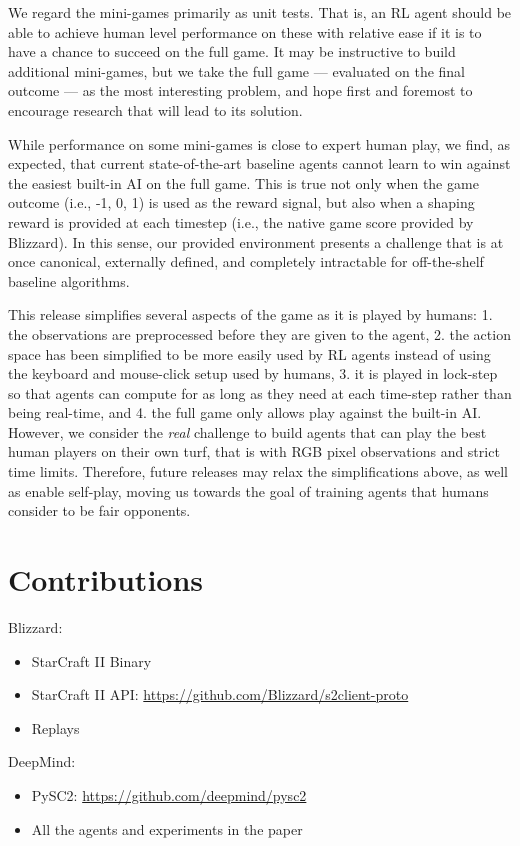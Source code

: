 We regard the mini-games primarily as unit tests.  That is, an RL agent should be able to achieve human level performance on these with relative ease if it is to have a chance to succeed on the full game.  It may be instructive to build additional mini-games, but we take the full game --- evaluated on the final outcome --- as the most interesting problem, and hope first and foremost to encourage research that will lead to its solution.

While performance on some mini-games is close to expert human play, we find, as expected, that current state-of-the-art baseline agents cannot learn to win against the easiest built-in AI on the full game.  This is true not only when the game outcome (i.e., -1, 0, 1) is used as the reward signal, but also when a shaping reward is provided at each timestep (i.e., the native game score provided by Blizzard). In this sense, our provided environment presents a challenge that is at once canonical, externally defined, and completely intractable for off-the-shelf baseline algorithms.

This release simplifies several aspects of the game as it is played by humans: 1. the observations are preprocessed before they are given to the agent, 2. the action space has been simplified to be more easily used by RL agents instead of using the keyboard and mouse-click setup used by humans, 3. it is played in lock-step so that agents can compute for as long as they need at each time-step rather than being real-time, and 4. the full game only allows play against the built-in AI. However, we consider the \emph{real} challenge to build agents that can play the best human players on their own turf, that is with RGB pixel observations and strict time limits. Therefore, future releases may relax the simplifications above, as well as enable self-play, moving us towards the goal of training agents that humans consider to be fair opponents.

\section*{Contributions}

Blizzard:

\begin{itemize}
    \item StarCraft II Binary \item StarCraft II API: \url{https://github.com/Blizzard/s2client-proto}
    \item Replays
\end{itemize}

DeepMind:

\begin{itemize}
    \item PySC2: \url{https://github.com/deepmind/pysc2}
    \item All the agents and experiments in the paper
\end{itemize}


